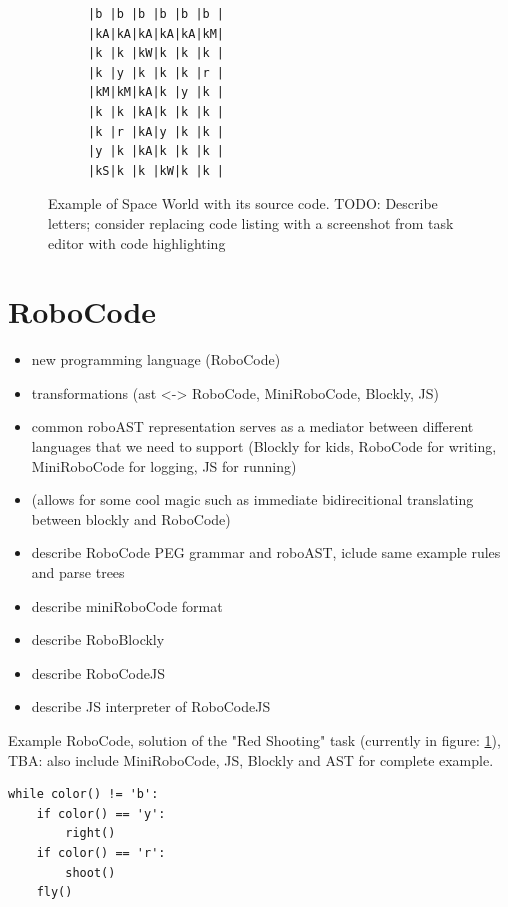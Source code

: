 \begin{figure}[h]
\begin{center}
\begin{subfigure}{.36\textwidth}
\centering
{\lstset{numbers=none}
\begin{lstlisting}
|b |b |b |b |b |b |
|kA|kA|kA|kA|kA|kM|
|k |k |kW|k |k |k |
|k |y |k |k |k |r |
|kM|kM|kA|k |y |k |
|k |k |kA|k |k |k |
|k |r |kA|y |k |k |
|y |k |kA|k |k |k |
|kS|k |k |kW|k |k |
\end{lstlisting}}
\end{subfigure}
\end{center}
\caption{Example of Space World with its source code. TODO: Describe letters; consider replacing code listing with a screenshot from task editor with code highlighting}
\label{fig:spaceworld-source}
\end{figure}


\section{RoboCode}

\begin{itemize}
\item new programming language (RoboCode)
\item transformations (ast <-> RoboCode, MiniRoboCode, Blockly, JS)
\item common roboAST representation serves as a mediator between different languages
      that we need to support (Blockly for kids, RoboCode for writing,
      MiniRoboCode for logging, JS for running)
\item (allows for some cool magic such as immediate bidirecitional translating between blockly and RoboCode)
\item describe RoboCode PEG grammar and roboAST, iclude same example rules and parse trees
\item describe miniRoboCode format
\item describe RoboBlockly
\item describe RoboCodeJS
\item describe JS interpreter of RoboCodeJS
\end{itemize}

Example RoboCode, solution of the "Red Shooting" task (currently in figure: \ref{fig:spaceworld-source}), TBA: also include MiniRoboCode, JS, Blockly and AST for complete example.

\begin{lstlisting}
while color() != 'b':
    if color() == 'y':
        right()
    if color() == 'r':
        shoot()
    fly()
\end{lstlisting}
